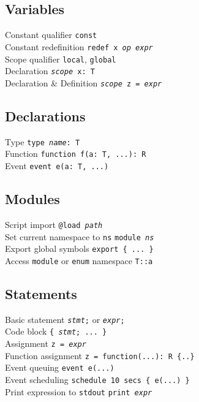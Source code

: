 \documentclass[10pt,landscape]{article}
\begin{document}
\begin{multicols*}{3}
\subsection*{Variables}

Constant qualifier \dotfill \texttt{const}\\
Constant redefinition \dotfill \texttt{redef x \textit{op} \textit{expr}}\\
Scope qualifier \dotfill \texttt{local}, \texttt{global}\\
Declaration \dotfill \texttt{\textit{scope} x:~T}\\
Declaration \& Definition \dotfill \texttt{\textit{scope} z = \textit{expr}}

\subsection*{Declarations}

Type \dotfill \texttt{type~\textit{name}:~T}\\
Function \dotfill \verb|function f(a: T, ...): R|\\
Event \dotfill \verb|event e(a: T, ...)|

\subsection*{Modules}

Script import \dotfill \texttt{@load \textit{path}}\\
Set current namespace to \texttt{ns} \dotfill \texttt{module \textit{ns}}\\
Export global symbols \dotfill \verb|export { ... }|\\
Access \texttt{module} or \texttt{enum} namespace \dotfill \verb|T::a|

\subsection*{Statements}

Basic statement \dotfill
  \texttt{\textit{stmt};} or \texttt{\textit{expr};}\\
Code block \dotfill \texttt{\{ \textit{stmt}; ... \}}\\
Assignment \dotfill \texttt{z = \textit{expr}}\\
Function assignment \dotfill \texttt{z~=~function(...):~R~\{..\}}\\
Event queuing \dotfill \verb|event e(...)|\\
Event scheduling \dotfill \verb|schedule 10 secs { e(...) }|\\
Print expression to \texttt{stdout} \dotfill \texttt{print \textit{expr}}\\


\end{multicols*}
\end{document}
